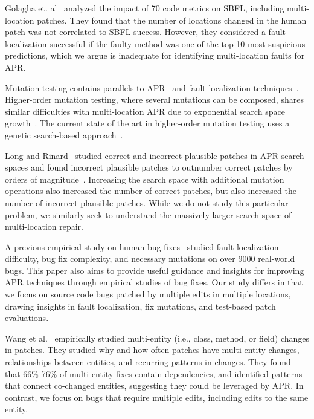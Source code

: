 \documentclass[10pt, conference]{IEEEtran}
\begin{document}
Golagha et. al~\cite{golagha2020can} analyzed the impact of 70 code metrics on
SBFL, including multi-location patches.  They found that the number of locations
changed in the human patch was not correlated to SBFL success.  However, they
considered a fault localization successful if the faulty method was one of the
top-10 most-suspicious predictions, which we argue is inadequate for
identifying multi-location faults for APR.

Mutation testing contains parallels to APR~\cite{weimer2013leveraging} and fault
localization techniques~\cite{metallaxis,muse,mbfl-survey}. Higher-order
mutation testing, where several mutations can be composed, shares similar
difficulties with multi-location APR due to exponential search space
growth~\cite{long-search-spaces}. The current state of the art in higher-order
mutation testing uses a genetic search-based approach~\cite{homs}.

Long and Rinard~\cite{long-search-spaces} studied correct and incorrect
plausible patches in APR search spaces and found incorrect plausible patches to
outnumber correct patches by orders of magnitude~\cite{spr, prophet}. Increasing
the search space with additional mutation operations also increased the number
of correct patches, but also increased the number of incorrect plausible
patches.  While we do not study this particular problem, we similarly seek to
understand the massively larger search space of multi-location repair.

A previous empirical study on human bug fixes~\cite{zhong2015} studied fault
localization difficulty, bug fix complexity, and necessary mutations on over
9000 real-world bugs. This paper also aims to provide useful guidance and
insights for improving APR techniques through empirical studies
of bug fixes. Our study differs in that we focus on source code bugs
patched by multiple edits in multiple locations, drawing insights in fault
localization, fix mutations, and test-based patch evaluations.

Wang et al.~\cite{wang2018} empirically studied multi-entity (i.e., class,
method, or field) changes in patches. They studied why and how often patches
have multi-entity changes, relationships between entities, and recurring
patterns in changes.  They found that 66\%-76\% of multi-entity fixes contain
dependencies, and identified patterns that connect co-changed entities,
suggesting they could be leveraged by APR. In contrast, we focus on bugs
that require multiple edits, including edits to the same entity.
\end{document}
